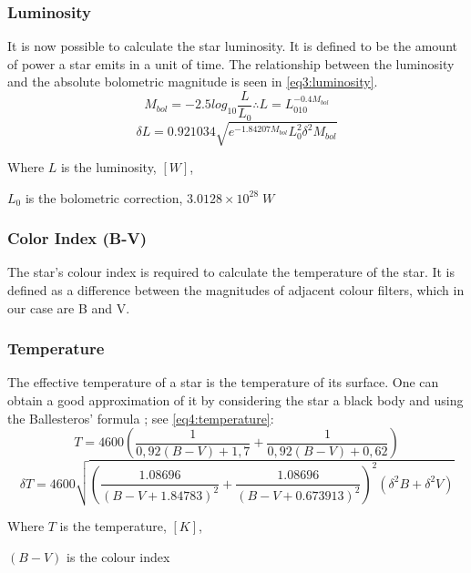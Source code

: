 \documentclass[stu, 11pt, a4paper, floatsintext]{apa7}
\begin{document}
	\subsubsection{Luminosity}
	It is now possible to calculate the star luminosity. It is defined to be the amount of power a star emits in a unit of time. The relationship between the luminosity and the absolute bolometric magnitude is seen in \cref{eq3:luminosity}.
	\begin{equation}
		\label{eq3:luminosity}
		M_{bol}=-2.5log_{10}\frac{L}{L_0} \therefore L=L_010^{-0.4M_{bol}}
	\end{equation}
	\begin{equation*}
		\delta L = 0.921034\sqrt{e^{-1.84207M_{bol}}L_0^2\delta^2M_{bol}}
	\end{equation*}
	\begin{center}
		Where $L$ is the luminosity, $[W]$,
		
 		$L_0$ is the bolometric correction, $3.0128 \times 10^{28}\;W$
	\end{center}
	\subsubsection{Color Index (B-V)}
	The star's colour index is required to calculate the temperature of the star. It is defined as a difference between the magnitudes of adjacent colour filters, which in our case are B and V.
	\subsubsection{Temperature}
	The effective temperature of a star is the temperature of its surface. One can obtain a good approximation of it  by considering the star a black body and using the Ballesteros' formula \Parencite{alonso_empirical_1996}; see \cref{eq4:temperature}:
	\begin{equation}
		\label{eq4:temperature}
		T=4600\left(\frac{1}{0,92(B-V)+1,7}+\frac{1}{0,92(B-V)+0,62}\right)
	\end{equation}
	\begin{equation*}
		\delta T=4600\sqrt{\left(\frac{1.08696}{(B-V+1.84783)^2} + \frac{1.08696}{(B-V+0.673913)^2}\right)^2\left(\delta^2B+\delta^2V\right)}
	\end{equation*}
	\begin{center}
		Where $T$ is the temperature, $[K]$,
		
 		$(B-V)$ is the colour index
	\end{center}
\end{document}
